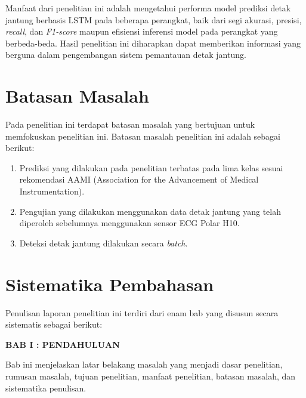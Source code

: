 Manfaat dari penelitian ini adalah mengetahui performa model prediksi detak jantung berbasis LSTM pada beberapa perangkat, baik dari segi akurasi, presisi, \emph{recall}, dan \emph{F1-score} maupun efisiensi inferensi model pada perangkat yang berbeda-beda. Hasil penelitian ini diharapkan dapat memberikan informasi yang berguna dalam pengembangan sistem pemantauan detak jantung.


\section{Batasan Masalah}

Pada penelitian ini terdapat batasan masalah yang bertujuan untuk memfokuskan penelitian ini. Batasan masalah penelitian ini adalah sebagai berikut:
\begin{enumerate}
  \item Prediksi yang dilakukan pada penelitian terbatas pada lima kelas sesuai rekomendasi AAMI (Association for the Advancement of Medical Instrumentation).
  \item Pengujian yang dilakukan menggunakan data detak jantung yang telah diperoleh sebelumnya menggunakan sensor ECG Polar H10.
  \item Deteksi detak jantung dilakukan secara \textit{batch}.
\end{enumerate}




\section{Sistematika Pembahasan}

Penulisan laporan penelitian ini terdiri dari enam bab yang disusun secara sistematis sebagai berikut:

\noindent
\textbf{BAB I : PENDAHULUAN}

Bab ini menjelaskan latar belakang masalah yang menjadi dasar penelitian, rumusan masalah, tujuan penelitian, manfaat penelitian, batasan masalah, dan sistematika penulisan.\\


